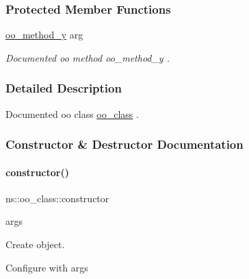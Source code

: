 \subsubsection*{Protected Member Functions}
\begin{DoxyCompactItemize}
\item 
\hyperlink{classns_1_1oo__class_ad07feb192f34010ed66d123338c7acdd}{oo\+\_\+method\+\_\+y} arg
\begin{DoxyCompactList}\small\item\em Documented oo method {\ttfamily oo\+\_\+method\+\_\+y} . \end{DoxyCompactList}\end{DoxyCompactItemize}


\subsubsection{Detailed Description}
Documented oo class {\ttfamily \hyperlink{classns_1_1oo__class}{oo\+\_\+class}} . 

\subsubsection{Constructor \& Destructor Documentation}
\hypertarget{classns_1_1oo__class_aa26b64151d4b4b0e8b4977aae7048f9b}{}\label{classns_1_1oo__class_aa26b64151d4b4b0e8b4977aae7048f9b} 
\paragraph{\texorpdfstring{constructor()}{constructor()}}
{\footnotesize\ttfamily ns\+::oo\+\_\+class\+::constructor\begin{DoxyParamCaption}\item[{}]{args  }\end{DoxyParamCaption}}



Create object. 

Configure with args 
\hypertarget{classns_1_1oo__class_af148cfc1c090a05986c68ac9452a510a}{}\label{classns_1_1oo__class_af148cfc1c090a05986c68ac9452a510a} 
